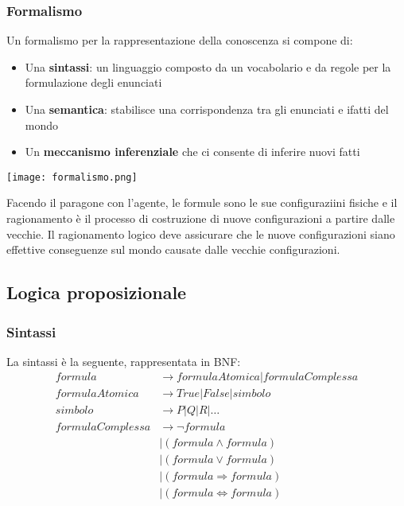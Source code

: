 \subsubsection{Formalismo}
Un formalismo per la rappresentazione della conoscenza si compone di:
\begin{itemize}
	\item Una \textbf{sintassi}: un linguaggio composto da un vocabolario e da regole per la formulazione degli enunciati
	\item Una \textbf{semantica}: stabilisce una corrispondenza tra gli enunciati e ifatti del mondo
	\item Un \textbf{meccanismo inferenziale} che ci consente di inferire nuovi fatti
\end{itemize}
\begin{center}
	\texttt{[image: formalismo.png]}
\end{center}
Facendo il paragone con l'agente, le formule sono le sue configuraziini fisiche e il ragionamento è il processo di costruzione di nuove configurazioni a partire dalle vecchie. Il ragionamento logico deve assicurare che le nuove configurazioni siano effettive conseguenze sul mondo causate dalle vecchie configurazioni.

\subsection{Logica proposizionale}
\subsubsection{Sintassi}
La sintassi è la seguente, rappresentata in BNF:
\begin{equation}
	\begin{split}
		formula & \to formulaAtomica \vert formulaComplessa \\
		formulaAtomica & \to True \vert False \vert simbolo \\
		simbolo & \to P \vert Q \vert R \vert \ldots \\
		formulaComplessa & \to \neg formula \\
		&\vert (formula \land formula) \\
		& \vert (formula \lor formula)\\
		& \vert (formula \Rightarrow formula)\\
		& \vert (formula \Leftrightarrow formula)
	\end{split}
\end{equation}

